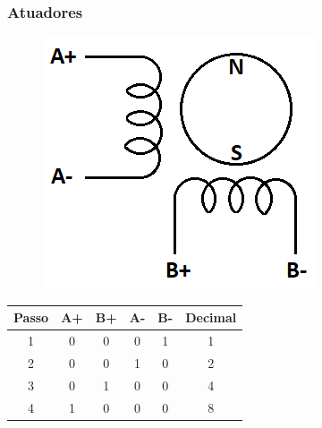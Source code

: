 \begin{frame}
\frametitle{Atuadores}
\centering

\begin{figure}
\centering
\includegraphics[scale = 0.4]{figuras/meumotorbipolar}
\end{figure}
    
\begin{tabular}{cccccc}
    \hline
    \textbf{Passo} & \textbf{A+} & \textbf{B+} & \textbf{A-} & \textbf{B-} & \textbf{Decimal}\\
    \hline
    1 & 0 & 0 & 0 & 1 & 1\\
    2 & 0 & 0 & 1 & 0 & 2\\
    3 & 0 & 1 & 0 & 0 & 4\\
    4 & 1 & 0 & 0 & 0 & 8\\        
    \hline       
\end{tabular}
\end{frame}

